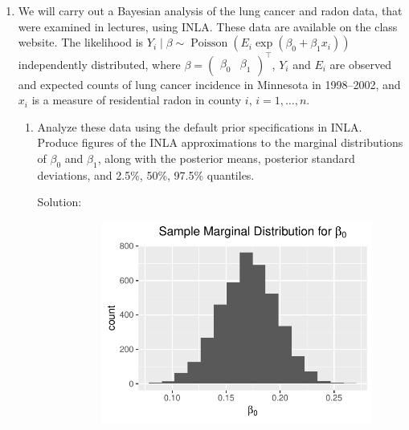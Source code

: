 \documentclass[letterpaper,11pt]{article}
\begin{document}
\begin{enumerate}
\begin{enumerate}
\begin{enumerate}
    \item 
    \item 
    \end{enumerate}
  \end{enumerate}
\item We will carry out a Bayesian analysis of the lung cancer and radon data,
  that were examined in lectures, using INLA. These data are available on the
  class website. The likelihood is
  $Y_i \mid \beta \sim \operatorname{Poisson}\left (E_i\exp\left(\beta_0 +
      \beta_1x_i\right)\right)$ independently distributed, where
  $\beta = \begin{pmatrix}\beta_0 & \beta_1\end{pmatrix}^\intercal$, $Y_i$ and
  $E_i$ are observed and expected counts of lung cancer incidence in Minnesota
  in 1998--2002, and $x_i$ is a measure of residential radon in county $i$,
  $i = 1,\ldots,n$.

  \begin{enumerate}
  \item Analyze these data using the default prior specifications in
    INLA. Produce figures of the INLA approximations to the marginal
    distributions of $\beta_0$ and $\beta_1$, along with the posterior means,
    posterior standard deviations, and 2.5\%, 50\%, 97.5\% quantiles.

    \begin{description}
    \item[Solution:]
      \begin{figure}
        \centering
        \includegraphics{p3_beta_0.pdf}
      \end{figure}


\end{description}
\end{enumerate}
\end{enumerate}
\end{document}
